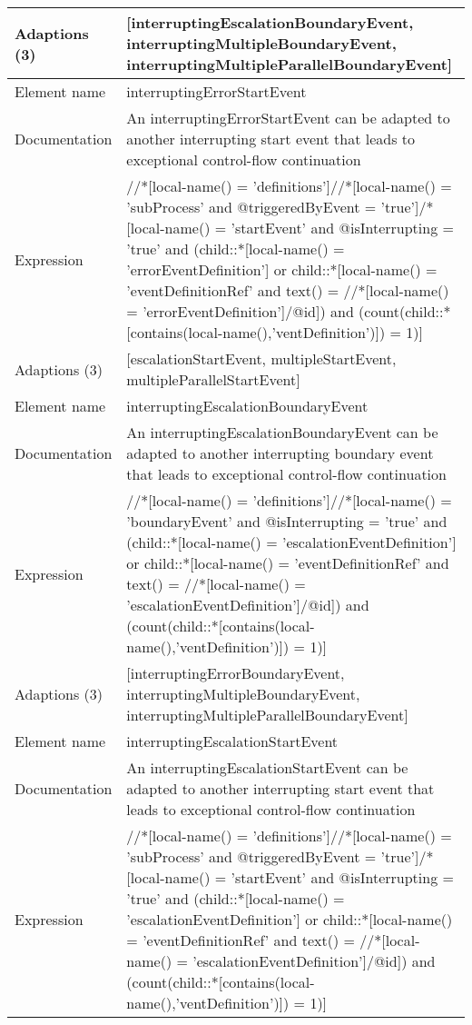 \begin{center}
\begin{tiny}
\begin{longtable}{p{}|p{}}
\myrowcolour
Adaptions (3) & [interruptingEscalationBoundaryEvent, interruptingMultipleBoundaryEvent, interruptingMultipleParallelBoundaryEvent]\\
\midrule
Element name & interruptingErrorStartEvent\\
\myrowcolour
Documentation &An interruptingErrorStartEvent can be adapted to another interrupting start event that leads to exceptional control-flow continuation\\
Expression & //*[local-name() = 'definitions']//*[local-name() = 'subProcess' and @triggeredByEvent = 'true']/*[local-name() = 'startEvent' and @isInterrupting = 'true' and (child::*[local-name() = 'errorEventDefinition'] or child::*[local-name() = 'eventDefinitionRef' and text() = //*[local-name() = 'errorEventDefinition']/@id]) and (count(child::*[contains(local-name(),'ventDefinition')]) = 1)]\\
\myrowcolour
Adaptions (3) & [escalationStartEvent, multipleStartEvent, multipleParallelStartEvent]\\
\midrule
Element name & interruptingEscalationBoundaryEvent\\
\myrowcolour
Documentation &An interruptingEscalationBoundaryEvent can be adapted to another interrupting boundary event that leads to exceptional control-flow continuation\\
Expression & //*[local-name() = 'definitions']//*[local-name() = 'boundaryEvent' and @isInterrupting = 'true' and (child::*[local-name() = 'escalationEventDefinition'] or child::*[local-name() = 'eventDefinitionRef' and text() = //*[local-name() = 'escalationEventDefinition']/@id]) and (count(child::*[contains(local-name(),'ventDefinition')]) = 1)]\\
\myrowcolour
Adaptions (3) & [interruptingErrorBoundaryEvent, interruptingMultipleBoundaryEvent, interruptingMultipleParallelBoundaryEvent]\\
\midrule
Element name & interruptingEscalationStartEvent\\
\myrowcolour
Documentation &An interruptingEscalationStartEvent can be adapted to another interrupting start event that leads to exceptional control-flow continuation\\
Expression & //*[local-name() = 'definitions']//*[local-name() = 'subProcess' and @triggeredByEvent = 'true']/*[local-name() = 'startEvent' and @isInterrupting = 'true' and (child::*[local-name() = 'escalationEventDefinition'] or child::*[local-name() = 'eventDefinitionRef' and text() = //*[local-name() = 'escalationEventDefinition']/@id]) and (count(child::*[contains(local-name(),'ventDefinition')]) = 1)]\\

\end{longtable}
\end{tiny}
\end{center}
